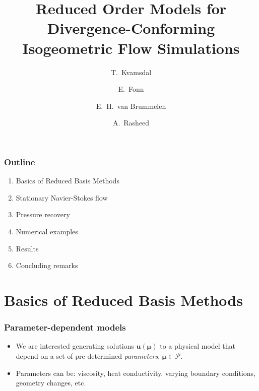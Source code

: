 \documentclass{beamer}
\begin{document}
\title[Reduced Order Models]{
  Reduced Order Models for Divergence-Conforming Isogeometric Flow Simulations
}
\author[T.~Kvamsdal]{
  T.~Kvamsdal \and
  E.~Fonn \and
  E.~H.~van Brummelen \and
  A.~Rasheed \and
}
\date[WCCM 2018]{}


\begin{frame}
  \titlepage
\end{frame}

\begin{frame}
  \frametitle{Outline}
  \begin{enumerate}
  \item Basics of Reduced Basis Methods
  \item Stationary Navier-Stokes flow
  \item Pressure recovery
  \item Numerical examples
  \item Results
  \item Concluding remarks
  \end{enumerate}
\end{frame}

\section{Basics of Reduced Basis Methods}

\begin{frame}
  \frametitle{Parameter-dependent models}

  \begin{center}
  \end{center}

  \begin{itemize}
  \item We are interested generating solutions $\bm u(\bm \mu)$ to a physical
    model that depend on a set of pre-determined \emph{parameters},
    $\bm\mu \in \mathcal{P}$.
  \item Parameters can be: viscosity, heat conductivity, varying boundary conditions, geometry
    changes, etc.
  \end{itemize}
\end{frame}
\end{document}
